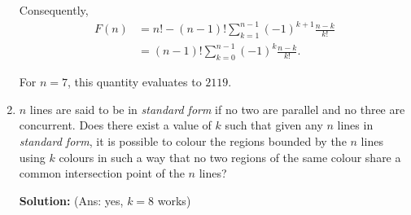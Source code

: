 \documentclass{article}
\newcommand{\solution}[1]{%
\ifsolutions%
    \textbf{Solution: } #1
\fi
}
\begin{document}
\begin{enumerate}
{Consequently,
\begin{align*}
    F(n) & = n! - (n - 1)! \sum_{k = 1}^{n-1} {(-1)}^{k + 1} \frac{n - k}{k!} \\
    & = (n - 1)! \sum_{k = 0}^{n - 1} {(-1)}^k \frac{n - k}{k!}.
\end{align*}

For $n = 7$, this quantity evaluates to $2119$.
}

\item\label{problem:four_colour} $n$ lines are said to be in \emph{standard form} if no two are parallel and no three are concurrent. Does there exist a value of $k$ such that given any $n$ lines in \emph{standard form}, it is possible to colour the regions bounded by the $n$ lines using $k$ colours in such a way that no two regions of the same colour share a common intersection point of the $n$ lines?

\solution{%
(Ans: yes, $k = 8$ works)

}
\end{enumerate}
\end{document}

